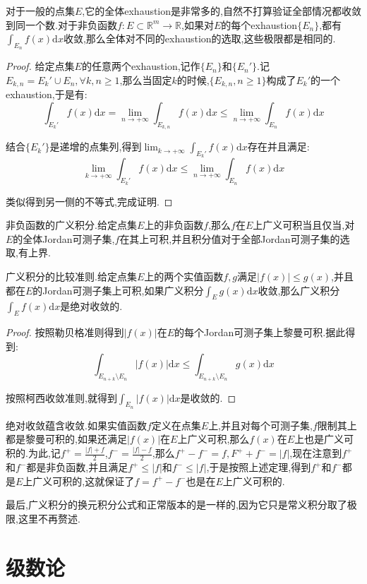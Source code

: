 对于一般的点集$E$,它的全体exhaustion是非常多的,自然不打算验证全部情况都收敛到同一个数.对于非负函数$f:E\subset\mathbb{R}^m\to\mathbb{R}$,如果对$E$的每个exhaustion$\{E_n\}$,都有$\int_{E_n}f(x)\mathrm{d}x$收敛,那么全体对不同的exhaustion的选取,这些极限都是相同的.
\begin{proof}
	
	给定点集$E$的任意两个exhaustion,记作$\{E_n\}$和$\{E_n'\}$.记$E_{k,n}=E_k'\cup E_n,\forall k,n\ge1$,那么当固定$k$的时候,$\{E_{k,n},n\ge1\}$构成了$E_k'$的一个exhaustion,于是有:
	$$\int_{E_k'}f(x)\mathrm{d}x=\lim_{n\to+\infty}\int_{E_{k,n}}f(x)\mathrm{d}x\le\lim_{n\to+\infty}\int_{E_n}f(x)\mathrm{d}x$$
	
	结合$\{E_k'\}$是递增的点集列,得到$\lim_{k\to+\infty}\int_{E_k'}f(x)\mathrm{d}x$存在并且满足:
	$$\lim_ {k\to+\infty}\int_{E_k'}f(x)\mathrm{d}x\le\lim_ {n\to+\infty}\int_{E_n}f(x)\mathrm{d}x$$
	
	类似得到另一侧的不等式,完成证明.
	
\end{proof}

非负函数的广义积分.给定点集$E$上的非负函数$f$,那么$f$在$E$上广义可积当且仅当,对$E$的全体Jordan可测子集,$f$在其上可积,并且积分值对于全部Jordan可测子集的选取,有上界.



广义积分的比较准则.给定点集$E$上的两个实值函数$f,g$满足$|f(x)|\le g(x)$,并且都在$E$的Jordan可测子集上可积,如果广义积分$\int_Eg(x)\mathrm{d}x$收敛,那么广义积分$\int_Ef(x)\mathrm{d}x$是绝对收敛的.
\begin{proof}
	
	按照勒贝格准则得到$|f(x)|$在$E$的每个Jordan可测子集上黎曼可积.据此得到:
	$$\int_{E_{n+k}\setminus E_n}|f(x)|\mathrm{d}x\le\int_{E_{n+k}\setminus E_n}g(x)\mathrm{d}x$$
	
	按照柯西收敛准则,就得到$\int_{E_n}|f(x)|\mathrm{d}x$是收敛的.
	
\end{proof}

绝对收敛蕴含收敛.如果实值函数$f$定义在点集$E$上,并且对每个可测子集,$f$限制其上都是黎曼可积的,如果还满足$|f(x)|$在$E$上广义可积,那么$f(x)$在$E$上也是广义可积的.为此,记$f^+=\frac{|f|+f}{2}$,$f^-=\frac{|f|-f}{2}$,那么$f^+-f^-=f,F^++f^-=|f|$,现在注意到$f^+$和$f^-$都是非负函数,并且满足$f^+\le|f|$和$f^-\le|f|$,于是按照上述定理,得到$f^+$和$f^-$都是$E$上广义可积的,这就保证了$f=f^+-f^-$也是在$E$上广义可积的.

最后,广义积分的换元积分公式和正常版本的是一样的,因为它只是常义积分取了极限,这里不再赘述.
\newpage
\section{级数论}
